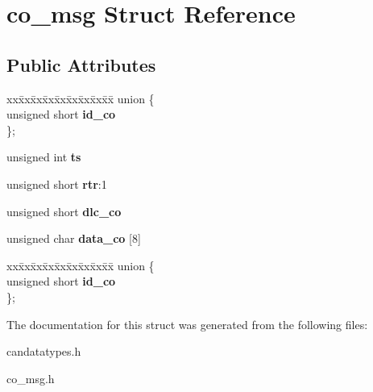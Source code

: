 \hypertarget{structco__msg}{}\section{co\+\_\+msg Struct Reference}
\label{structco__msg}
\subsection*{Public Attributes}
\begin{DoxyCompactItemize}
\item 
\mbox{\label{structco__msg_af8251e2eaf9e807267d3ced55e292142}} 
\begin{tabbing}
xx\=xx\=xx\=xx\=xx\=xx\=xx\=xx\=xx\=\kill
union \{\\
\>unsigned short {\bfseries id\_co}\\
\}; \\

\end{tabbing}\item 
\mbox{\label{structco__msg_aaf8cd43d17baf495c982c87866fc90b2}} 
unsigned int {\bfseries ts}
\item 
\mbox{\label{structco__msg_a4352880745fa6bc63d6c4e3c77870029}} 
unsigned short {\bfseries rtr}\+:1
\item 
\mbox{\label{structco__msg_ab19d6996baf97d346427d9789d7e4a6b}} 
unsigned short {\bfseries dlc\+\_\+co}
\item 
\mbox{\label{structco__msg_a3ced1bf4d72ca82fe53c829d42cd946e}} 
unsigned char {\bfseries data\+\_\+co} \mbox{[}8\mbox{]}
\item 
\mbox{\label{structco__msg_a549464c55b7bbab6345f082dab73b275}} 
\begin{tabbing}
xx\=xx\=xx\=xx\=xx\=xx\=xx\=xx\=xx\=\kill
union \{\\
\>unsigned short {\bfseries id\_co}\\
\}; \\

\end{tabbing}\end{DoxyCompactItemize}


The documentation for this struct was generated from the following files\+:\begin{DoxyCompactItemize}
\item 
candatatypes.\+h\item 
co\+\_\+msg.\+h\end{DoxyCompactItemize}
